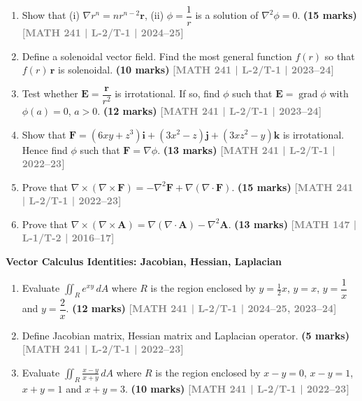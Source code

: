 \documentclass[12pt,a4paper]{article}
\newcommand{\yr}[1]{\hfill\textcolor{gray}{\small\textbf{[#1]}}}
\newcommand{\mk}[1]{\textcolor{orange!70!black}{\small\textbf{(#1 marks)}}}
\newcommand{\subtopic}[2]{%
  \vspace{10pt}
  \noindent\begin{tcolorbox}[colback=#1!8,colframe=#1,boxrule=0.6pt,arc=4pt,
    left=6pt,right=6pt,top=4pt,bottom=4pt]
    \small\bfseries\textcolor{#1}{#2}
  \end{tcolorbox}
  \vspace{2pt}
}
\begin{document}
\begin{enumerate}\item Show that (i) $\nabla r^{n}=nr^{n-2}\mathbf{r}$, (ii) $\phi=\dfrac{1}{r}$ is a solution of $\nabla^{2}\phi=0$.
\mk{15} \yr{MATH 241 | L-2/T-1 | 2024--25}

\item Define a solenoidal vector field. Find the most general function $f(r)$ so that $f(r)\,\mathbf{r}$ is solenoidal.
\mk{10} \yr{MATH 241 | L-2/T-1 | 2023--24}

\item Test whether $\mathbf{E}=\dfrac{\mathbf{r}}{r^{2}}$ is irrotational. If so, find $\phi$ such that $\mathbf{E}=\operatorname{grad}\phi$ with $\phi(a)=0$, $a>0$.
\mk{12} \yr{MATH 241 | L-2/T-1 | 2023--24}

\item Show that $\mathbf{F}=(6xy+z^{3})\mathbf{i}+(3x^{2}-z)\mathbf{j}+(3xz^{2}-y)\mathbf{k}$ is irrotational. Hence find $\phi$ such that $\mathbf{F}=\nabla\phi$.
\mk{13} \yr{MATH 241 | L-2/T-1 | 2022--23}

\item Prove that $\nabla\times(\nabla\times\mathbf{F})=-\nabla^{2}\mathbf{F}+\nabla(\nabla\cdot\mathbf{F})$.
\mk{15} \yr{MATH 241 | L-2/T-1 | 2022--23}

\item Prove that $\nabla\times(\nabla\times\mathbf{A})=\nabla(\nabla\cdot\mathbf{A})-\nabla^{2}\mathbf{A}$.
\mk{13} \yr{MATH 147 | L-1/T-2 | 2016--17}

\end{enumerate}

\subtopic{cD}{Vector Calculus Identities: Jacobian, Hessian, Laplacian}
\label{sub:s4-identities}

\begin{enumerate}\item Evaluate $\displaystyle\iint_{R}e^{xy}\,dA$ where $R$ is the region enclosed by $y=\tfrac{1}{2}x$, $y=x$, $y=\dfrac{1}{x}$ and $y=\dfrac{2}{x}$.
\mk{12} \yr{MATH 241 | L-2/T-1 | 2024--25, 2023--24}

\item Define Jacobian matrix, Hessian matrix and Laplacian operator.
\mk{5} \yr{MATH 241 | L-2/T-1 | 2022--23}

\item Evaluate $\displaystyle\iint_{R}\frac{x-y}{x+y}\,dA$ where $R$ is the region enclosed by $x-y=0$, $x-y=1$, $x+y=1$ and $x+y=3$.
\mk{10} \yr{MATH 241 | L-2/T-1 | 2022--23}


\end{enumerate}
\end{document}
